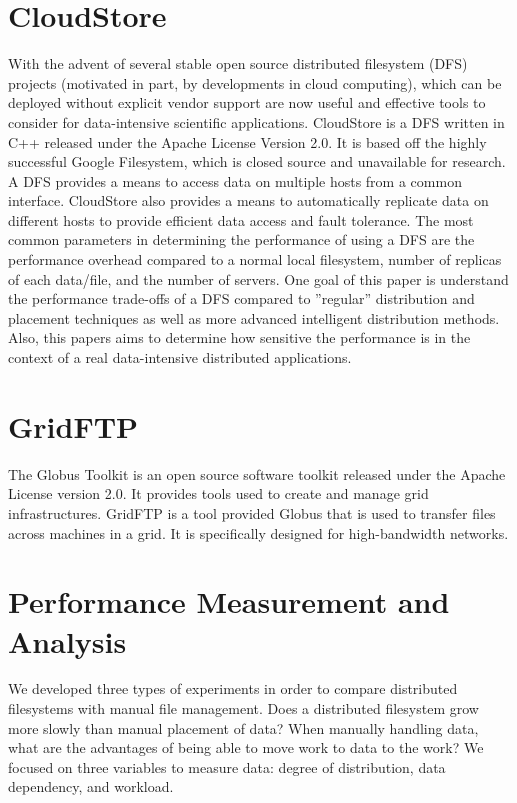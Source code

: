 \documentclass{rspublic}
\begin{document}
\section{CloudStore} With the advent of several stable open source
distributed filesystem (DFS) projects (motivated in part, by
developments in cloud computing), which can be deployed without explicit
vendor support are now useful and effective tools to consider for
data-intensive scientific applications.  CloudStore is a DFS written in
C++ released under the Apache License Version 2.0.  It is based off the
highly successful Google Filesystem, which is closed source and
unavailable for research.  A DFS provides a means to access data on
multiple hosts from a common interface.  CloudStore also provides a
means to automatically replicate data on different hosts to provide
efficient data access and fault tolerance.  The most common parameters
in determining the performance of using a DFS are the performance
overhead compared to a normal local filesystem, number of replicas of
each data/file, and the number of servers.  One goal of this paper is
understand the performance trade-offs of a DFS compared to ''regular''
distribution and placement techniques as well as more advanced
intelligent distribution methods.  Also, this papers aims to determine
how sensitive the performance is in the context of a real data-intensive
distributed applications.

\section{GridFTP} The Globus Toolkit is an open source software toolkit
released under the Apache License version 2.0.  It provides tools used
to create and manage grid infrastructures.  GridFTP is a tool provided
Globus that is used to transfer files across machines in a grid.  It is
specifically designed for high-bandwidth networks.

\section{Performance Measurement and Analysis} We developed three types of experiments in order
to compare distributed filesystems with manual file management.  Does a
distributed filesystem grow more slowly than manual placement of data?
When manually handling data, what are the advantages of being able to
move work to data to the work?  We focused on three variables to measure
data:  degree of distribution, data dependency, and workload.
\end{document}
